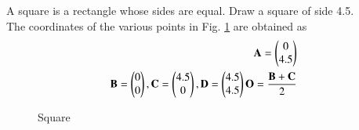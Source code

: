 %
\item A square is a rectangle whose sides are equal.  Draw a square of side 4.5.
\\
\solution The coordinates of the various points in Fig. \ref{fig:square} are obtained as
%
\begin{align}
\vec{A} = \myvec{0\\4.5}
\\
\vec{B} = \myvec{0\\0},
\vec{C} = \myvec{4.5\\0},
\vec{D} = \myvec{4.5\\4.5}
\vec{O} = \frac{\vec{B}+\vec{C}}{2}
%
\end{align}
%
\begin{figure}[!ht]
	\begin{center}
		\resizebox{\columnwidth}{!}{}
	\end{center}
	\caption{Square}
	\label{fig:square}	
\end{figure}

%
